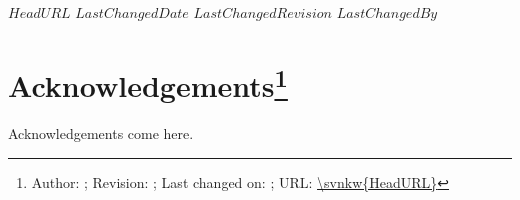 \svnidlong
{$HeadURL$}
{$LastChangedDate$}
{$LastChangedRevision$}
{$LastChangedBy$}

\section{Acknowledgements\footnote{Author: \svnauthor; Revision: \svnrev; Last changed on: \svndate; URL: \url{\svnkw{HeadURL}}}}
Acknowledgements come here.